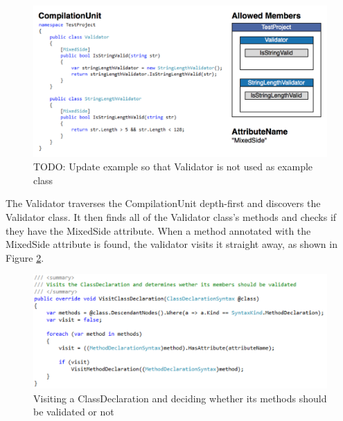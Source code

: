 		\begin{figure}[H]
			\begin{center}
				\centerline{\includegraphics[width=14cm]{resources/images/MixedSideValidationExample.png}}
			\end{center}
			\caption{TODO: Update example so that Validator is not used as example class}
			\label{fig:mixedSideValidationExample}
		\end{figure}		
		
		The Validator traverses the CompilationUnit depth-first and discovers the Validator class. It then finds all of the Validator class's methods and checks if they have the MixedSide attribute. When a method annotated with the MixedSide attribute is found, the validator visits it straight away, as shown in Figure \ref{fig:ValidatorVisitClassDeclaration}. 

		\begin{figure}[H]
			\begin{center}
				\centerline{\includegraphics[width=14cm]{resources/images/ValidatorVisitClassDeclaration.png}}
			\end{center}
			\caption{Visiting a ClassDeclaration and deciding whether its methods should be validated or not}
			\label{fig:ValidatorVisitClassDeclaration}
		\end{figure}

